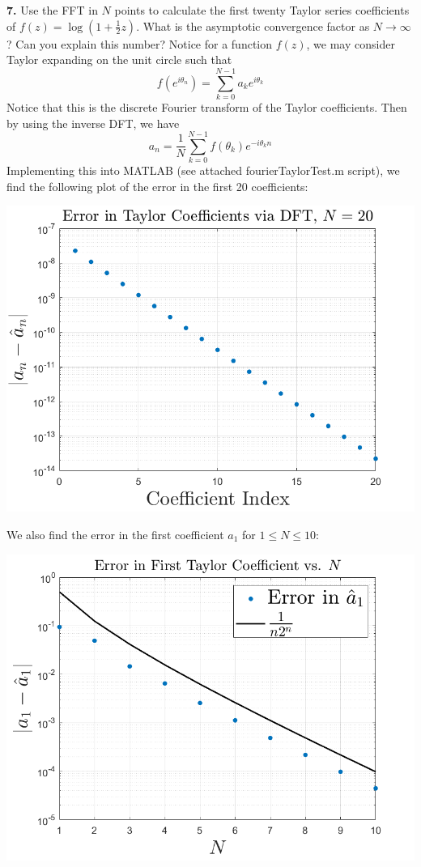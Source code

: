 \documentclass{article}
\begin{document}
\textbf{7.} Use the FFT in $N$ points to calculate the first twenty Taylor series coefficients of $f(z) = \log(1 + \frac{1}{2}z)$. What is the asymptotic convergence factor as $N \to \infty$? Can you explain this number?
\newline\newline
Notice for a function $f(z)$, we may consider Taylor expanding on the unit circle such that 
\[f(e^{i\theta_n}) = \sum_{k = 0}^{N-1}a_ke^{i\theta_k}\]
Notice that this is the discrete Fourier transform of the Taylor coefficients. Then by using the inverse DFT, we have
\[a_n = \frac{1}{N}\sum_{k=0}^{N-1}f(\theta_k)e^{-i\theta_kn}\]
Implementing this into MATLAB (see attached fourierTaylorTest.m script), we find the following plot of the error in the first 20 coefficients:
\begin{center}
    \includegraphics[scale = 0.5]{errInDFTCoeffs}
\end{center}
We also find the error in the first coefficient $a_1$ for $1 \leq N \leq 10$:
\begin{center}
    \includegraphics[scale = 0.5]{errInFirstDFTTaylorCoeff}
\end{center}
\end{document}
